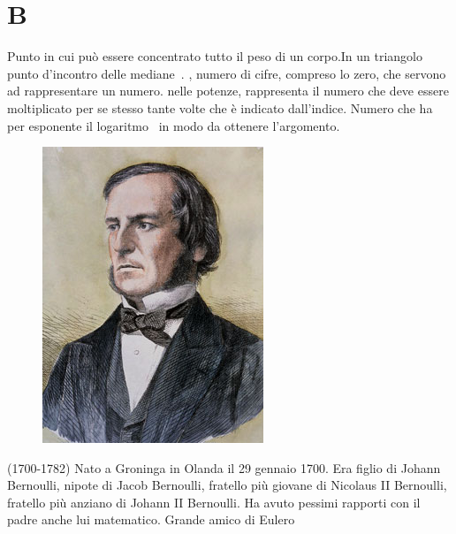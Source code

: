 \chapter{B}
\vspace{5mm} 
Punto in cui può essere concentrato tutto il peso di un corpo.In un triangolo punto d'incontro delle mediane\pointsto~.
, numero di cifre, compreso lo zero, che servono ad rappresentare un numero. nelle potenze, rappresenta il numero che deve essere moltiplicato per se stesso tante volte che è indicato dall'indice. Numero che ha per esponente il logaritmo\pointsto~ in modo da ottenere l'argomento.
\begin{figure}
	\centering
	\label{fig:georgeboolecolor}
	\includegraphics[width=0.7\linewidth]{Figure/B/George_Boole_color}
\end{figure}
(1700-1782) Nato a Groninga in Olanda il 29 gennaio 1700. Era figlio di Johann Bernoulli, nipote di Jacob Bernoulli, fratello più giovane di Nicolaus II Bernoulli, fratello più anziano di Johann II Bernoulli. Ha avuto pessimi rapporti con il padre anche lui matematico. Grande amico di Eulero\pointsto~\cite{Kline1972}
